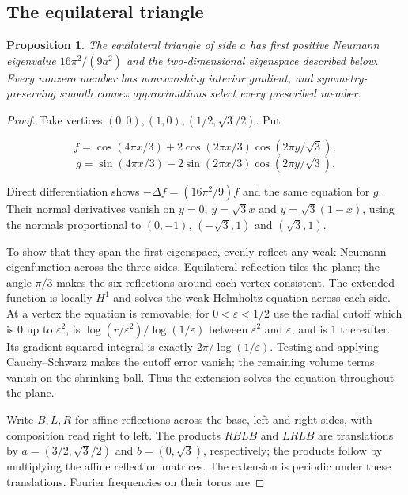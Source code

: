 \documentclass[11pt]{article}
\newtheorem{proposition}[theorem]{Proposition}
\theoremstyle{definition}
\theoremstyle{remark}
\numberwithin{equation}{section}
\begin{document}
\subsection{The equilateral triangle}\label{subsec:8.3}
\begin{proposition}\label{prop:equilateral}
The equilateral triangle of side $a$ has first positive Neumann eigenvalue $16\pi^2/(9a^2)$ and the two-dimensional eigenspace described below. Every nonzero member has nonvanishing interior gradient, and symmetry-preserving smooth convex approximations select every prescribed member.
\end{proposition}
\begin{proof}

Take vertices $(0,0),(1,0),(1/2,\sqrt3/2)$. Put

\begin{equation}\label{eq:src-8-01}
f=\cos(4\pi x/3)+2\cos(2\pi x/3)\cos(2\pi y/\sqrt3),
\end{equation}
\begin{equation}\label{eq:src-8-02}
g=\sin(4\pi x/3)-2\sin(2\pi x/3)\cos(2\pi y/\sqrt3).
\end{equation}

Direct differentiation shows $-\Delta f=(16\pi^2/9)f$ and the same equation for $g$. Their normal derivatives vanish on $y=0$, $y=\sqrt3x$ and $y=\sqrt3(1-x)$, using the normals proportional to $(0,-1)$, $(-\sqrt3,1)$ and $(\sqrt3,1)$. 

To show that they span the first eigenspace, evenly reflect any weak Neumann eigenfunction across the three sides. Equilateral reflection tiles the plane; the angle $\pi/3$ makes the six reflections around each vertex consistent. The extended function is locally $H^1$ and solves the weak Helmholtz equation across each side. At a vertex the equation is removable: for $0<\varepsilon<1/2$ use the radial cutoff which is 0 up to $\varepsilon^2$, is $\log(r/\varepsilon^2)/\log(1/\varepsilon)$ between $\varepsilon^2$ and $\varepsilon$, and is 1 thereafter. Its gradient squared integral is exactly $2\pi/\log(1/\varepsilon)$. Testing and applying Cauchy--Schwarz makes the cutoff error vanish; the remaining volume terms vanish on the shrinking ball. Thus the extension solves the equation throughout the plane.

Write $B,L,R$ for affine reflections across the base, left and right sides, with composition read right to left. The products $RBLB$ and $LRLB$ are translations by $a=(3/2,\sqrt3/2)$ and $b=(0,\sqrt3)$, respectively; the products follow by multiplying the affine reflection matrices. The extension is periodic under these translations. Fourier frequencies on their torus are


\end{proof}
\end{document}

